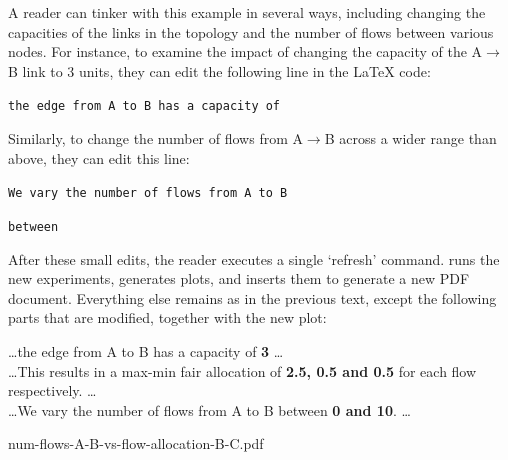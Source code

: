 \noindent A reader can tinker with this example in several ways, including changing the capacities of the links in the topology and the number of flows between various nodes. For instance, to examine the impact of changing the capacity of the A$\rightarrow$B link to 3 units, they can edit the following line in the \LaTeX{} code:

\vspace{0.05in}
\texttt{the edge from A to B has a capacity of  }
\vspace{0.05in}

\noindent Similarly, to change the number of flows from A$\rightarrow$B across a wider range than above, they can edit this line:

\vspace{0.05in}
\texttt{We vary the number of flows from A to B}

\texttt{between  }
\vspace{0.05in}

\noindent After these small edits, the reader executes a single `refresh' command. \sysname runs the new experiments, generates plots, and inserts them to generate a new PDF document. Everything else remains as in the previous text, except the following parts that are modified, together with the new plot:

\vspace{0.2cm}

\begin{mdframed}[style=annotex]
\ldots the edge from A to B has a capacity of \textbf{3} \ldots\\
\ldots This results in a max-min fair allocation of \textbf{2.5, 0.5 and 0.5} for each flow respectively. \ldots\\
\ldots We vary the number of flows from A to B between \textbf{0 and 10}. \ldots
\begin{center}
{num-flows-A-B-vs-flow-allocation-B-C.pdf}
\end{center}
\end{mdframed}
\vspace{0.2cm}

